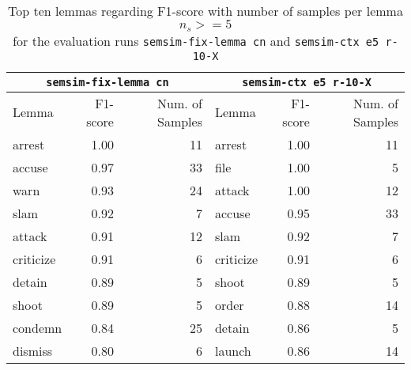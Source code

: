\documentclass[11pt]{scrreprt}
\begin{document}
\begin{table}[ht]
\centering
\begin{tabular}{lrr|lrr}
\toprule
\multicolumn{3}{c|}{\texttt{semsim-fix-lemma cn}} & \multicolumn{3}{c}{\texttt{semsim-ctx e5 r-10-X}} \\ 
\midrule
Lemma      & F1-score & Num. of Samples & Lemma      & F1-score & Num. of Samples \\
\midrule
arrest     & 1.00     & 11            & arrest     & 1.00     & 11            \\
accuse     & 0.97     & 33            & file       & 1.00     & 5             \\
warn       & 0.93     & 24            & attack     & 1.00     & 12            \\
slam       & 0.92     & 7             & accuse     & 0.95     & 33            \\
attack     & 0.91     & 12            & slam       & 0.92     & 7             \\
criticize  & 0.91     & 6             & criticize  & 0.91     & 6             \\
detain     & 0.89     & 5             & shoot      & 0.89     & 5             \\
shoot      & 0.89     & 5             & order      & 0.88     & 14            \\
condemn    & 0.84     & 25            & detain     & 0.86     & 5             \\
dismiss    & 0.80     & 6             & launch     & 0.86     & 14            \\ 
\bottomrule
\end{tabular}
\caption{Top ten lemmas regarding F1-score with number of samples per lemma \(n_s >= 5\) \\
for the evaluation runs \texttt{semsim-fix-lemma cn} and \texttt{semsim-ctx e5 r-10-X}}
\end{table}
\end{document}
